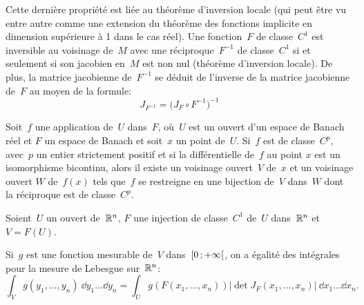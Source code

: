 \medskipvm
{}
Cette dernière propriété est liée au théorème d'inversion locale (qui peut être vu entre autre
comme une extension du théorème des fonctions implicite en dimension supérieure à 1 dans le cas réel).
\medskipvm
Une fonction~$F$ de classe~$C^1$ est inversible au voisinage de~$M$ avec une réciproque~$F^{-1}$ 
de classe~$C^1$ si et seulement si son jacobien en~$M$ est non nul (théorème d'inversion locale). 
De plus, la matrice jacobienne de~$F^{-1}$ se déduit de l'inverse de la matrice jacobienne de~$F$ 
au moyen de la formule:
\begin{equation}J_{F^{-1}} = \bigl( J_F \circ F^{-1} \bigr)^{-1}\end{equation}

\begin{theoreme}
Soit~$f$ une application de~$U$ dans~$F$, où~$U$ est un ouvert d'un espace de Banach réel et 
$F$ un espace de Banach et soit~$x$ un point de~$U$.
Si~$f$ est de classe~$C^p$, avec~$p$ un entier strictement positif et si la différentielle de~$f$ au point 
$x$ est un isomorphisme bicontinu, alors il existe un voisinage ouvert~$V$ de~$x$ et un voisinage ouvert 
$W$ de~$f(x)$ tels que~$f$ se restreigne en une bijection de~$V$ dans~$W$ dont la réciproque est de 
classe~$C^p$.
\end{theoreme}
\medskipvm
{}
\medskipvm
\begin{theoreme}

Soient~$U$ un ouvert de~$\mathbb R^n$, $F$ une injection de classe~$C^1$ de~$U$ dans~$\mathbb R^n$ et~$V=F(U)$.

Si~$g$ est une fonction mesurable de~$V$ dans~$\mathopen{[}0\,;+\infty\mathclose{[}$, on a égalité des intégrales pour la mesure 
de Lebesgue sur~$\mathbb R^n$:
\begin{equation}  \int_V g(y_1,\ldots,y_n)~\dd y_1\ldots\dd y_n = \int_U g\left(F\left(x_1,\ldots,x_n\right)\right) 
\left|\det J_F(x_1,\ldots,x_n)\right|~\dd x_1\ldots\dd x_n.
\end{equation}
\end{theoreme}
\medskipvm
{}

